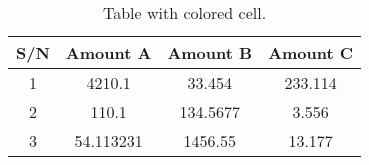 \documentclass{article}
\begin{document}
			
\begin{table}[h!]
		\begin{center}
			\caption{Table with colored cell.}
			\label{tab:table1}
			\begin{tabular}{|c|c|c|c|} %
				\hline
				\textbf{S/N} & \textbf{Amount A} & \textbf{Amount B} & \textbf{Amount C}\\
				\hline
				\cellcolor{purple!25}1 & 4210.1 & 33.454 & 233.114\\
				\cellcolor{blue!20}2 & 110.1 & 134.5677 & 3.556\\
				\cellcolor{red!35}3 & 54.113231 & 1456.55 & 13.177\\
				\hline
			\end{tabular}
	\end{center}
\end{table}
\end{document}
